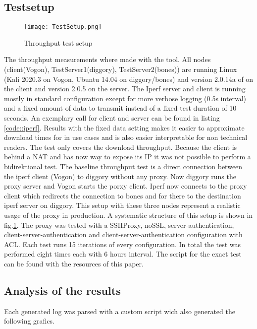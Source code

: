 \documentclass[12pt, a4paper]{scrartcl}
\begin{document}
\subsection{Testsetup}
\begin{figure}
    \centering
    \texttt{[image: TestSetup.png]}
    \caption{Throughput test setup}\label{fig::test}
\end{figure}
The throughput measurements where made with the  tool. All nodes (client(Vogon), TestServer1(diggory), TestServer2(bones)) are running Linux (Kali 2020.3 on Vogon, Ubuntu 14.04 on diggory/bones) and version 2.0.14a of  on the client and version 2.0.5 on the server. The Iperf server and client is running mostly in standard configuration except for more verbose logging (0.5s interval) and a fixed amount of data to transmit instead of a fixed test duration of 10 seconds. An exemplary call for client and server can be found in listing \ref{code::iperf}. Results with the fixed data setting makes it easier to approximate download times for in use cases and is also easier interpretable for non technical readers.\newline
The test only covers the download throughput. Because the client is behind a NAT and has now way to expose its IP it was not possible to perform a bidirektional test.\newline
The baseline throughput test is a direct connection between the iperf client (Vogon) to diggory without any proxy. Now diggory runs the proxy server and Vogon starts the porxy client. Iperf now connects to the proxy client which redirects the connection to bones and for there to the destination iperf server on diggory. This setup with these three nodes represent a realistic usage of the proxy in production. A systematic structure of this setup is shown in fig.\@\ref{fig::test}.\newline
The proxy was tested with a SSHProxy, noSSL, server-authentication, client-server-authentication and client-server-authentication configuration with \ac{ACL}. Each test runs 15 iterations of every configuration. In total the test was performed eight times each with 6 hours interval. The script for the exact test can be found with the resources of this paper.
\subsection{Analysis of the results}
Each generated log was parsed with a custom script wich also generated the following grafics.
\end{document}
